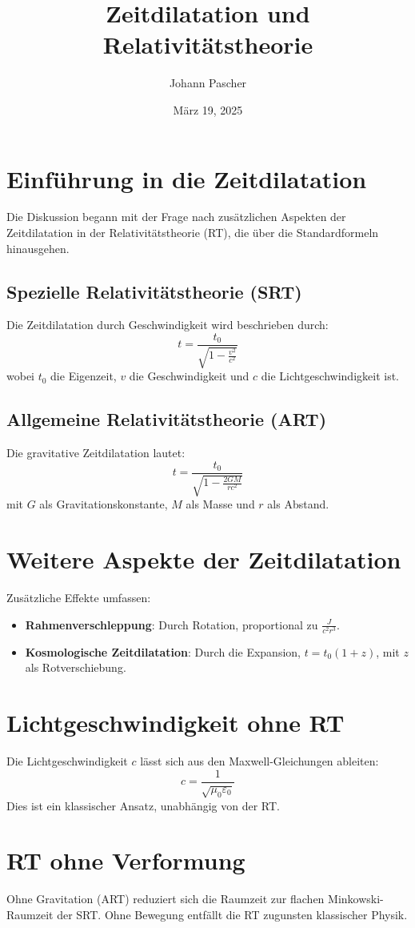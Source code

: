 \documentclass[a4paper,12pt]{article}
\title{Zeitdilatation und Relativitätstheorie}
\author{Johann Pascher}
\date{März 19, 2025}
\begin{document}
	
	\maketitle
	
	\section{Einführung in die Zeitdilatation}
	Die Diskussion begann mit der Frage nach zusätzlichen Aspekten der Zeitdilatation in der Relativitätstheorie (RT), die über die Standardformeln hinausgehen.
	
	\subsection{Spezielle Relativitätstheorie (SRT)}
	Die Zeitdilatation durch Geschwindigkeit wird beschrieben durch:
	\[
	t = \frac{t_0}{\sqrt{1 - \frac{v^2}{c^2}}}
	\]
	wobei \(t_0\) die Eigenzeit, \(v\) die Geschwindigkeit und \(c\) die Lichtgeschwindigkeit ist.
	
	\subsection{Allgemeine Relativitätstheorie (ART)}
	Die gravitative Zeitdilatation lautet:
	\[
	t = \frac{t_0}{\sqrt{1 - \frac{2GM}{rc^2}}}
	\]
	mit \(G\) als Gravitationskonstante, \(M\) als Masse und \(r\) als Abstand.
	
	\section{Weitere Aspekte der Zeitdilatation}
	Zusätzliche Effekte umfassen:
	\begin{itemize}
		\item \textbf{Rahmenverschleppung}: Durch Rotation, proportional zu \(\frac{J}{c^2 r^3}\).
		\item \textbf{Kosmologische Zeitdilatation}: Durch die Expansion, \(t = t_0 (1 + z)\), mit \(z\) als Rotverschiebung.
	\end{itemize}
	
	\section{Lichtgeschwindigkeit ohne RT}
	Die Lichtgeschwindigkeit \(c\) lässt sich aus den Maxwell-Gleichungen ableiten:
	\[
	c = \frac{1}{\sqrt{\mu_0 \varepsilon_0}}
	\]
	Dies ist ein klassischer Ansatz, unabhängig von der RT.
	
	\section{RT ohne Verformung}
	Ohne Gravitation (ART) reduziert sich die Raumzeit zur flachen Minkowski-Raumzeit der SRT. Ohne Bewegung entfällt die RT zugunsten klassischer Physik.
	
\end{document}
